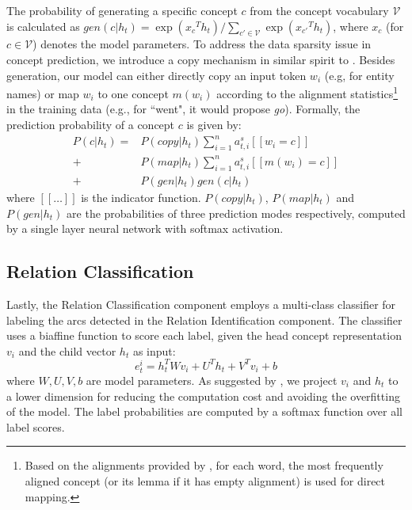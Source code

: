 \documentclass[11pt,a4paper]{article}
\begin{document}
	The probability of generating a specific concept $c$ from the concept vocabulary $\mathcal{V}$ is calculated as $gen(c|h_t) = {\exp({x_c}^Th_t)} / { \sum_{c'\in \mathcal{V}} \exp({x_{c'}}^Th_t)}$, where $x_c$ (for $c\in\mathcal{V}$) denotes the model parameters. To address the data sparsity issue in concept prediction, we introduce a copy mechanism in similar spirit to . Besides generation, our model can either directly copy an input token $w_i$ (e.g, for entity names) or map $w_i$ to one concept $m(w_i)$ according to the alignment statistics\footnote{Based on the alignments provided by , for each word, the most frequently aligned concept (or its lemma if it has empty alignment) is used for direct mapping.} in the training data (e.g., for ``went", it would propose \textit{go}). Formally, the prediction probability of a concept $c$ is given by:
	\begin{align*}
	P(c|h_t) = &P(copy|h_t) \sum_{i=1}^na^s_{t,i}[[w_i=c]] \\
	+& P(map|h_t)\sum_{i=1}^na^s_{t,i}[[m(w_i)=c]] \\ 
	+& P(gen|h_t) gen(c|h_t)
	\end{align*} 
	where $[[\ldots]]$ is the indicator function. $P(copy|h_t)$, $P(map|h_t)$ and $P(gen|h_t)$ are the probabilities of three prediction modes respectively, computed by a single layer neural network with softmax activation.
	\subsection{Relation Classification}
	\label{rc}
	Lastly, the Relation Classification component employs a multi-class classifier for labeling the arcs detected in the Relation Identification component. The classifier uses a biaffine function to score each label, given the head concept representation $v_i$ and the child vector $h_t$ as input:
	\begin{equation}
	e_t^i = h_t^TWv_i + U^Th_t + V^Tv_i + b
	\nonumber
	\end{equation}
	where $W, U, V, b$ are model parameters. As suggested by , we project $v_i$ and $h_t$ to a lower dimension for reducing the computation cost and avoiding the overfitting of the model. The label probabilities are computed by a softmax function over all label scores.
\end{document}

